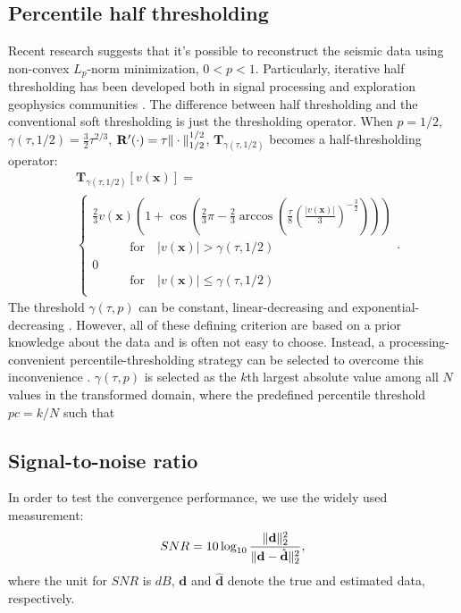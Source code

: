 \subsection{Percentile half thresholding}
Recent research suggests that it's possible to reconstruct the seismic data using non-convex $L_p$-norm minimization, $0< p <1$. Particularly, iterative half thresholding has been developed both in signal processing and exploration geophysics communities \cite[]{zongben2012,pengliang20131}. The difference between half thresholding and the conventional soft thresholding is just the thresholding operator. When $p=1/2$, $\gamma(\tau,1/2)=\frac{3}{2}\tau^{2/3}$, $\mathbf{R}'(\cdot)=\tau \Arrowvert \cdot \Arrowvert_{1/2}^{1/2}$, $\mathbf{T}_{\gamma(\tau,1/2)}$ becomes a half-thresholding operator:
\begin{align}
\label{eq:half}
&\mathbf{T}_{\gamma(\tau,1/2)}[v(\mathbf{x})] = \\
&\left\{ \begin{array}{l}
\frac{2}{3}v(\mathbf{x})\left(1+\cos(\frac{2}{3}\pi - \frac{2}{3} \arccos(\frac{\tau}{8}(\frac{|v(\mathbf{x})|}{3})^{-\frac{3}{2}}))\right) \\
\quad\quad\quad  \text{for}\quad  |v(\mathbf{x})| > \gamma(\tau,1/2)  \\
0	\\
	\quad\quad\quad    \text{for}\quad  |v(\mathbf{x})| \le \gamma(\tau,1/2) \\
\end{array}\right..
\end{align} 
The threshold $\gamma(\tau,p)$ can be constant, linear-decreasing \cite[]{abma2006} and exponential-decreasing \cite[]{jianjun2010}. However, all of these defining criterion are based on a prior knowledge about the data and is often not easy to choose. Instead, a processing-convenient percentile-thresholding strategy can be selected to overcome this inconvenience \cite[]{dian2008}. $\gamma(\tau,p)$ is selected as the $k$th largest absolute value among all $N$ values in the transformed domain, where the predefined percentile threshold $pc=k/N$ such that  

\subsection{Signal-to-noise ratio}
In order to test the convergence performance, we use the widely used measurement\cite[]{hennenfent2006,guochang2009,sep}:
\begin{equation}
\label{eq:snr}
SNR=10\log_{10} \frac{\Arrowvert \mathbf{d} \Arrowvert_2^2}{\Arrowvert\mathbf{d}-\hat{\mathbf{d}}\Arrowvert_2^2},
\end{equation} 
where the unit for $SNR$ is $dB$, $\mathbf{d}$ and $\hat{\mathbf{d}}$ denote the true and estimated data, respectively. 


